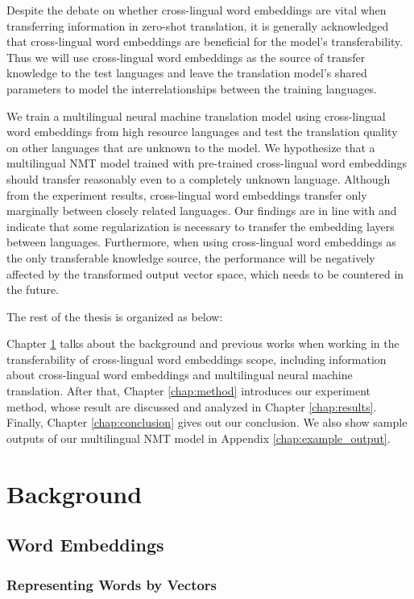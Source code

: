 \documentclass[thesis,fonts=libertine]{cluu}
\begin{document}
Despite the debate on whether cross-lingual word embeddings are vital when transferring information in zero-shot translation, it is generally acknowledged that cross-lingual word embeddings are beneficial for the model's transferability. Thus we will use cross-lingual word embeddings as the source of transfer knowledge to the test languages and leave the translation model's shared parameters to model the interrelationships between the training languages.

We train a multilingual neural machine translation model using cross-lingual word embeddings from high resource languages and test the translation quality on other languages that are unknown to the model. We hypothesize that a multilingual NMT model trained with pre-trained cross-lingual word embeddings should transfer reasonably even to a completely unknown language. Although from the experiment results, cross-lingual word embeddings transfer only marginally between closely related languages. Our findings are in line with \textcite{aji-etal-2020-neural} and indicate that some regularization is necessary to transfer the embedding layers between languages. Furthermore, when using cross-lingual word embeddings as the only transferable knowledge source, the performance will be negatively affected by the transformed output vector space, which needs to be countered in the future.

The rest of the thesis is organized as below:

Chapter \ref{chap:background} talks about the background and previous works when working in the transferability of cross-lingual word embeddings scope, including information about cross-lingual word embeddings and multilingual neural machine translation. After that, Chapter \ref{chap:method} introduces our experiment method, whose result are discussed and analyzed in Chapter \ref{chap:results}. Finally, Chapter \ref{chap:conclusion} gives out our conclusion. We also show sample outputs of our multilingual NMT model in Appendix \ref{chap:example_output}.

\chapter{Background}
\label{chap:background}

\section{Word Embeddings}
\subsection{Representing Words by Vectors}
\end{document}
